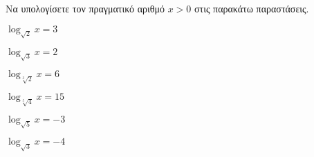 Να υπολογίσετε τον πραγματικό αριθμό $ x>0 $ στις παρακάτω παραστάσεις.
\begin{multicols}{2}
\begin{rlist}
\item $ \log_{\sqrt{2}}{x}=3 $
\item $ \log_{\sqrt{3}}{x}=2 $
\item $ \log_{\sqrt[3]{2}}{x}=6 $
\item $ \log_{\sqrt[5]{4}}{x}=15 $
\item $ \log_{\sqrt{5}}{x}=-3 $
\item $ \log_{\sqrt{3}}{x}=-4 $
\end{rlist}
\end{multicols}
